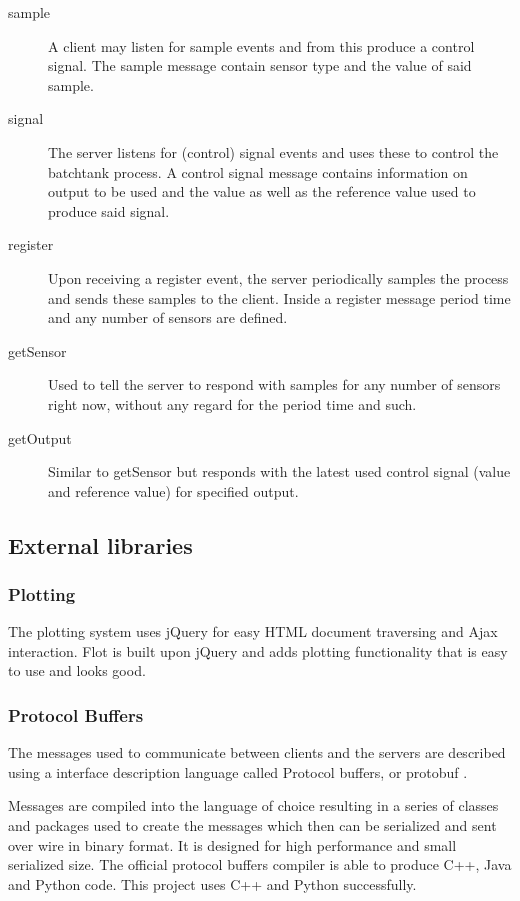 \documentclass{article}
\begin{document}
\begin{description}
\item[sample]
  A client may listen for sample events and from this produce a control
  signal. The sample message contain sensor type and the value of said
  sample.
\item[signal]
  The server listens for (control) signal events and uses these to
  control the batchtank process. A control signal message contains
  information on output to be used and the value as well as the
  reference value used to produce said signal.
\item[register]
  Upon receiving a register event, the server periodically samples the
  process and sends these samples to the client. Inside a register
  message period time and any number of sensors are defined.
\item[getSensor]
  Used to tell the server to respond with samples for any number of
  sensors right now, without any regard for the period time and such.
\item[getOutput]
  Similar to getSensor but responds with the latest used control signal
  (value and reference value) for specified output.
\end{description}

\subsection{External libraries}
\subsubsection{Plotting}
The plotting system uses jQuery \cite{jquery} for easy HTML document
traversing and Ajax interaction. Flot \cite{flot} is built upon jQuery
and adds plotting functionality that is easy to use and looks good.


\subsubsection{Protocol Buffers}
The messages used to communicate between clients and the servers are
described using a interface description language called Protocol
buffers, or protobuf \cite{protobuf}.

Messages are compiled into the language of choice resulting in a series
of classes and packages used to create the messages which then can be
serialized and sent over wire in binary format. It is designed for high
performance and small serialized size. The official protocol buffers
compiler is able to produce C++, Java and Python code. This project uses
C++ and Python successfully.
\end{document}
